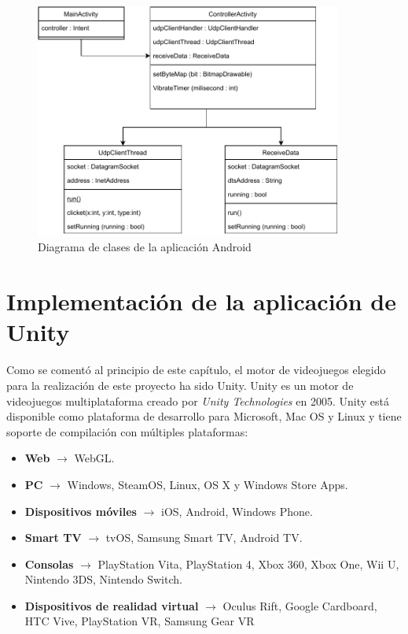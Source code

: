 \begin{figure}[!h]

\centering
\includegraphics[width=0.9\textwidth]{./Imagenes/Vectorial/Arquitectura_App_Android.pdf}
\caption{Diagrama de clases de la aplicaci\'on Android}
\end{figure}

\section{Implementaci\'on de la aplicaci\'on de Unity}
\label{unity}

Como se coment\'o al principio de este cap\'itulo, el motor de videojuegos elegido para la realizaci\'on de este proyecto ha sido Unity. Unity es un motor de videojuegos multiplataforma creado por \textit{Unity Technologies} en 2005. Unity est\'a disponible como plataforma de desarrollo para Microsoft, Mac OS y Linux y tiene soporte de compilaci\'on con m\'ultiples plataformas:

\begin {itemize}
\item \textbf{Web} $\rightarrow$ WebGL.
\item \textbf{PC} $\rightarrow$ Windows, SteamOS, Linux, OS X y Windows Store Apps.
\item \textbf{Dispositivos m\'oviles} $\rightarrow$ iOS, Android, Windows Phone.
\item \textbf{Smart TV} $\rightarrow$ tvOS, Samsung Smart TV, Android TV.
\item \textbf{Consolas} $\rightarrow$ PlayStation Vita, PlayStation 4, Xbox 360, Xbox One, Wii U, Nintendo 3DS, Nintendo Switch.
\item \textbf{Dispositivos de realidad virtual} $\rightarrow$ Oculus Rift, Google Cardboard, HTC Vive, PlayStation VR, Samsung Gear VR
\end {itemize}

